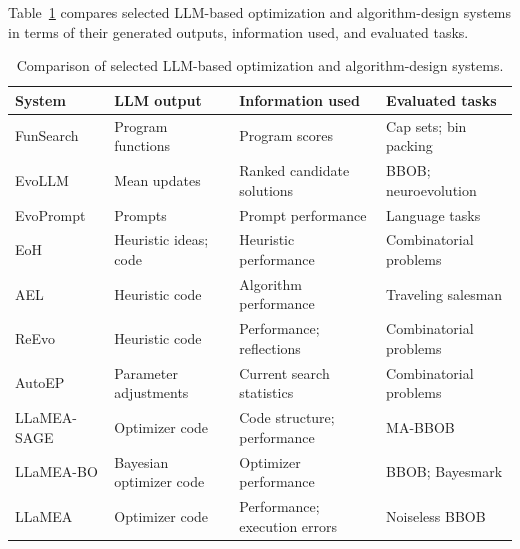 Table~\ref{tab:llm_aad_comparison} compares selected LLM-based
optimization and algorithm-design systems in terms of their
generated outputs, information used, and evaluated tasks.

\begin{table}[htbp]
    \centering
    \caption{Comparison of selected LLM-based optimization
    and algorithm-design systems.}
    \label{tab:llm_aad_comparison}
    \footnotesize
    \setlength{\tabcolsep}{3pt}
    \renewcommand{\arraystretch}{1.15}

    \begin{tabularx}{\textwidth}{
        >{\raggedright\arraybackslash}p{2.0cm}
        >{\raggedright\arraybackslash}p{2.4cm}
        >{\raggedright\arraybackslash}X
        >{\raggedright\arraybackslash}p{2.6cm}
    }
        \toprule
        \textbf{System} &
        \textbf{LLM output} &
        \textbf{Information used} &
        \textbf{Evaluated tasks} \\
        \midrule

        FunSearch \cite{Romera2023} &
        Program functions &
        Program scores &
        Cap sets; bin packing \\

        EvoLLM \cite{Lange2024} &
        Mean updates &
        Ranked candidate solutions &
        BBOB; neuroevolution \\

        EvoPrompt \cite{Guo2023} &
        Prompts &
        Prompt performance &
        Language tasks \\

        EoH \cite{Liu2024} &
        Heuristic ideas; code &
        Heuristic performance &
        Combinatorial problems \\

        AEL \cite{AEL2024} &
        Heuristic code &
        Algorithm performance &
        Traveling salesman \\

        ReEvo \cite{ReEvo2024} &
        Heuristic code &
        Performance; reflections &
        Combinatorial problems \\

        AutoEP \cite{AutoEP2026} &
        Parameter adjustments &
        Current search statistics &
        Combinatorial problems \\

        LLaMEA-SAGE \cite{LLaMEASAGE2026} &
        Optimizer code &
        Code structure; performance &
        MA-BBOB \\

        LLaMEA-BO \cite{LLaMEABO2025} &
        Bayesian optimizer code &
        Optimizer performance &
        BBOB; Bayesmark \\

        LLaMEA \cite{LLaMEA2024} &
        Optimizer code &
        Performance; execution errors &
        Noiseless BBOB \\

        \bottomrule
    \end{tabularx}
\end{table}


